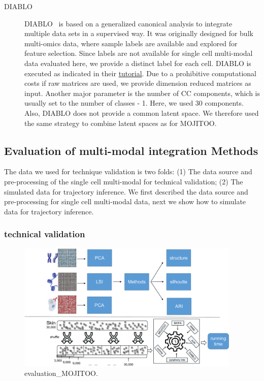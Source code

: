 \begin{description}
\item[DIABLO]
DIABLO~\cite{singh2019diablo} is based on a generalized canonical analysis to integrate multiple data sets in a supervised way. It was originally designed for bulk multi-omics data, where sample labels are available and explored for feature selection. Since labels are not available for single cell multi-modal data evaluated here, we provide a distinct label for each cell. DIABLO is executed as indicated in their \href{http://mixomics.org/mixdiablo/}{tutorial}. Due to a prohibitive computational costs if raw matrices are used, we provide dimension reduced matrices as input.  Another major parameter is the number of CC components, which is usually set to the number of classes - 1. Here, we used 30 components. Also, DIABLO does not provide a common latent space. We therefore used the same strategy to combine latent spaces as for MOJITOO. 

\end{description}


\subsection{Evaluation of multi-modal integration Methods}
The data we used for technique validation is two folds: (1) The data source and pre-processing of the single cell multi-modal for technical validation; (2) The simulated data for trajectory inference. We first described the data source and pre-processing for single cell multi-modal data, next we show how to simulate data for trajectory inference.

\subsubsection{technical validation}


\begin{figure}[!ht]
	\centering
	\includegraphics[width=0.95\textwidth]{evaluation_MOJITOO/fig}
	\vspace{0.1cm}
	\caption[evaluation\_MOJITOO]{
	evaluation\_MOJITOO.}
	\label{fig:evaluation_MOJITOO}
\end{figure}

